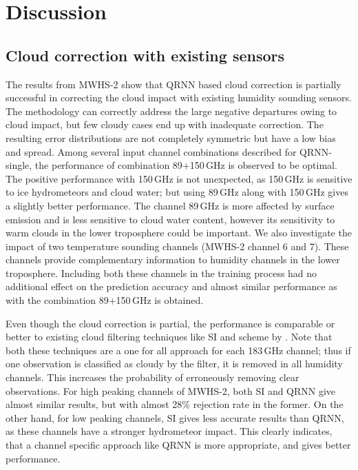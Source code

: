 \documentclass[amt, manuscript]{copernicus}
\begin{document}
\section{Discussion}
\label{discussions}

\subsection{Cloud correction with existing sensors}
%
The results from MWHS-2 show that QRNN based cloud correction is partially successful in correcting the cloud impact with existing humidity sounding sensors. The methodology can correctly address the large negative departures owing to cloud impact, but few cloudy cases end up with inadequate correction. The resulting error distributions are not completely symmetric but have a low bias and spread. Among several input channel combinations described for QRNN-single, the performance of combination 89+150\,GHz is observed to be optimal. The positive performance with 150\,GHz is not unexpected, as 150\,GHz is sensitive to ice hydrometeors and cloud water; but using 89\,GHz along with 150\,GHz gives a slightly better performance. The channel 89\,GHz is more affected by surface emission and is less sensitive to cloud water content, however its sensitivity to warm clouds in the lower troposphere could be important. We also investigate the impact of two temperature sounding channels (MWHS-2 channel 6 and 7). These channels provide complementary information to humidity channels in the lower troposphere. Including both these channels in the training process had no additional effect on the prediction accuracy and almost similar performance as with the combination 89+150\,GHz is obtained. 

Even though the cloud correction is partial, the performance is comparable or better to existing cloud filtering techniques like SI and scheme by \cite{buehler:aclou:07}. Note that both these techniques are a one for all approach for each 183\,GHz channel; thus if one observation is classified as cloudy by the filter, it is removed in all humidity channels. This increases the probability of erroneously removing clear observations. For high peaking channels of MWHS-2, both SI and QRNN give almost similar results, but with almost 28\% rejection rate in the former. On the other hand, for low peaking channels, SI gives less accurate results than QRNN, as these channels have a stronger hydrometeor impact. This clearly indicates, that a channel specific approach like QRNN is more appropriate, and gives better performance. 
\end{document}
